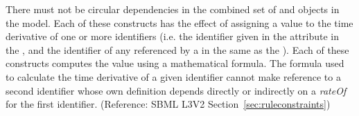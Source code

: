 There must not be circular dependencies in the combined set of \RateRule and \KineticLaw objects in the model.  Each of these constructs has the effect of assigning a value to the time derivative of one or more identifiers (i.e. the identifier given in the attribute  in the \RateRule, and the identifier of any \Species referenced by a \SpeciesReference in the same \Reaction as the \KineticLaw).  Each of these constructs computes the value using a mathematical formula.  The formula used to calculate the time derivative of a given identifier cannot make reference to a second identifier whose own definition depends directly or indirectly on a \emph{rateOf}  for the first identifier.  (Reference: SBML L3V2 Section~\ref{sec:ruleconstraints})
